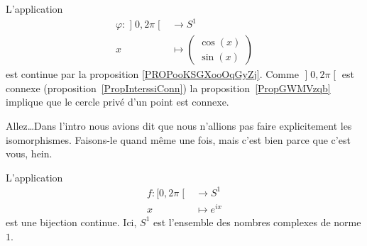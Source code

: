 \begin{example} \label{EXooJFDPooBZADKs}
	L'application
	\begin{equation}
		\begin{aligned}
			\varphi\colon \mathopen] 0 , 2\pi \mathclose[ & \to S^1                            \\
			x                                             & \mapsto \begin{pmatrix}
				\cos(x) \\
				\sin(x)
			\end{pmatrix}
		\end{aligned}
	\end{equation}
	est continue par la proposition \ref{PROPooKSGXooOqGyZj}. Comme \( \mathopen] 0 , 2\pi \mathclose[\) est connexe (proposition~\ref{PropInterssiConn}) la proposition~\ref{PropGWMVzqb} implique que le cercle privé d'un point est connexe.
\end{example}


Allez\ldots Dans l'intro nous avions dit que nous n'allions pas faire explicitement les isomorphismes. Faisons-le quand même une fois, mais c'est bien parce que c'est vous, hein.
\begin{proposition}     \label{PROPooZEFEooEKMOPT}
	L'application
	\begin{equation}
		\begin{aligned}
			f\colon \mathopen[ 0 , 2\pi \mathclose[ & \to S^1         \\
			x                                       & \mapsto  e^{ix}
		\end{aligned}
	\end{equation}
	est une bijection continue. Ici, \( S^1\) est l'ensemble des nombres complexes de norme \( 1\).
\end{proposition}

